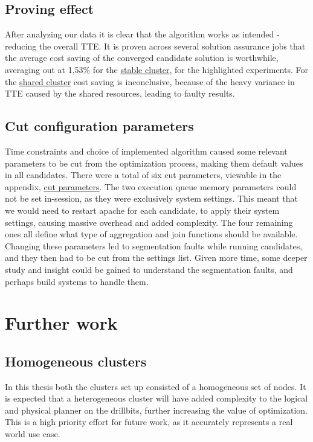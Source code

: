 \documentclass[a4paper,english]{report}
\begin{document}
	\section{Proving effect}
	 After analyzing our data it is clear that the algorithm works as intended - reducing the overall TTE. It is proven across several solution assurance jobs that the average cost saving of the converged candidate solution is worthwhile, averaging out at 1,53\% for the \hyperref[table:cluster_stable]{stable cluster}, for the highlighted experiments. For the \hyperref[table:cluster_shared]{shared cluster} cost saving is inconclusive, because of the heavy variance in TTE caused by the shared resources, leading to faulty results.
	\section{Cut configuration parameters}
	Time constraints and choice of implemented algorithm caused some relevant parameters to be cut from the optimization process, making them default values in all candidates. There were a total of six cut parameters, viewable in the appendix, \hyperref[table:removed_params]{cut parameters}. The two execution queue memory parameters could not be set in-session, as they were exclusively system settings. This meant that we would need to restart apache for each candidate, to apply their system settings, causing massive overhead and added complexity. The four remaining ones all define what type of aggregation and join functions should be available. Changing these parameters led to segmentation faults while running candidates, and they then had to be cut from the settings list. Given more time, some deeper study and insight could be gained to understand the segmentation faults, and perhaps build systems to handle them.
	
	\chapter{Further work}
	\section{Homogeneous clusters}
	In this thesis both the clusters set up consisted of a homogeneous set of nodes. It is expected that a heterogeneous cluster will have added complexity to the logical and physical planner on the drillbits, further increasing the value of optimization. This is a high priority effort for future work, as it accurately represents a real world use case.
\end{document}
